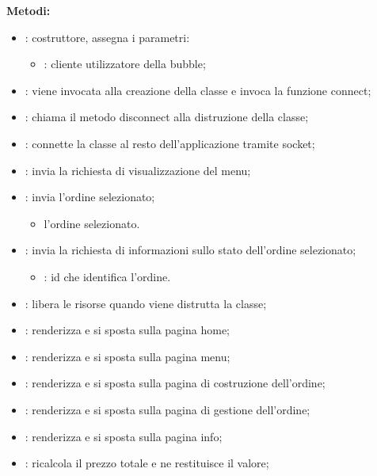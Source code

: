 \textbf{Metodi:}
\begin{itemize}
	\item {}: costruttore, assegna i parametri:
		\begin{itemize}
			\item {}: cliente utilizzatore della bubble;
		\end{itemize}
	\item {}: viene invocata alla creazione della classe e invoca la funzione connect;
	\item {}: chiama il metodo disconnect alla distruzione della classe;
	\item {}: connette la classe al resto dell'applicazione tramite socket;
	\item {}: invia la richiesta di visualizzazione del menu;
	\item {}: invia l'ordine selezionato;
		\begin{itemize}
			\item {} l'ordine selezionato.
		\end{itemize}
	\item {}: invia la richiesta di informazioni sullo stato dell'ordine selezionato;
		\begin{itemize}
			\item {}: id che identifica l'ordine.
		\end{itemize}
	\item {}: libera le risorse quando viene distrutta la classe;
	\item {}: renderizza e si sposta sulla pagina home;
	\item {}: renderizza e si sposta sulla pagina menu;
	\item {}: renderizza e si sposta sulla pagina di costruzione dell'ordine;
	\item {}: renderizza e si sposta sulla pagina di gestione dell'ordine; 
	\item {}: renderizza e si sposta sulla pagina info;
	\item {}: ricalcola il prezzo totale e ne restituisce il valore;

\end{itemize}
